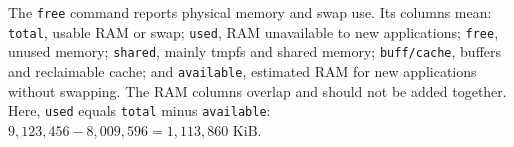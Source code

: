 The \texttt{free} command reports physical memory and swap use. Its columns
mean: \texttt{total}, usable RAM or swap; \texttt{used}, RAM unavailable to new
applications; \texttt{free}, unused memory; \texttt{shared}, mainly tmpfs and
shared memory; \texttt{buff/cache}, buffers and reclaimable cache; and
\texttt{available}, estimated RAM for new applications without swapping.
The RAM columns overlap and should not be added together. Here,
\texttt{used} equals \texttt{total} minus \texttt{available}:
$9{,}123{,}456 - 8{,}009{,}596 = 1{,}113{,}860\text{ KiB}$.
